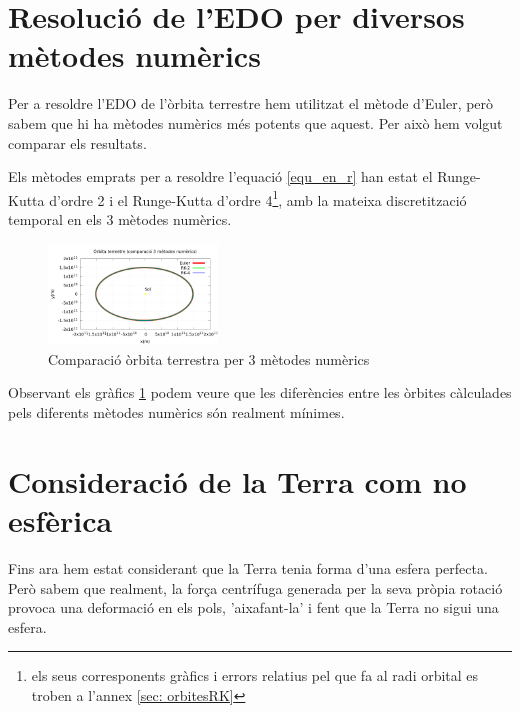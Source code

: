 \documentclass[11pt]{article}
\begin{document}
\section{Resolució de l'EDO per diversos mètodes numèrics}\label{sec: edos}
Per a resoldre l'EDO de l'òrbita terrestre hem utilitzat el mètode d'Euler, però sabem que hi ha mètodes numèrics més potents que aquest. Per això hem volgut comparar els resultats.

Els mètodes emprats per a resoldre l'equació \eqref{equ_en_r} han estat el Runge-Kutta d'ordre 2 i el Runge-Kutta d'ordre 4\footnote{els seus corresponents gràfics i errors relatius pel que fa al radi orbital es troben a l'annex \ref{sec: orbitesRK}}, amb la mateixa discretització temporal en els 3 mètodes numèrics.

\begin{figure}[H]
    \centering
    \includegraphics[width=0.4\textwidth]{orbita3met.PNG}
    \caption{Comparació òrbita terrestra per 3 mètodes numèrics}
    \label{fig: orbita3met}
\end{figure}

Observant els gràfics \ref{fig: orbita3met} podem veure que les diferències entre les òrbites càlculades pels diferents mètodes numèrics són realment mínimes.

\section{Consideració de la Terra com no esfèrica}\label{sec: terranoesfera}
Fins ara hem estat considerant que la Terra tenia forma d'una esfera perfecta. Però sabem que realment, la força centrífuga generada per la seva pròpia rotació provoca una deformació en els pols, 'aixafant-la' i fent que la Terra no sigui una esfera.
\end{document}
